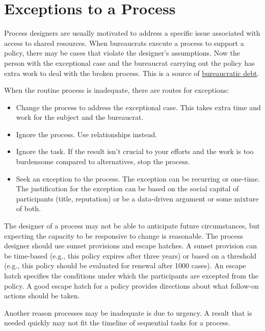 \section{Exceptions to a Process\label{sec:exceptions-to-process}}


Process designers are usually motivated to address a specific issue associated with access to shared resources. When bureaucrats execute a process to support a policy, there may be cases that violate the designer's assumptions. Now the person with the exceptional case and the bureaucrat carrying out the policy has extra work to deal with the broken process. This is a source of \hyperref[sec:bureaucratic-debt]{bureaucratic debt}. 

When the routine process is inadequate, there are routes for exceptions:
\begin{itemize}
    \item Change the process to address the exceptional case. This takes extra time and work for the subject and the bureaucrat.
    \item Ignore the process. Use relationships instead.
    \item Ignore the task. If the result isn't crucial to your efforts and the work is too burdensome compared to alternatives, stop the process.
    \item Seek an exception to the process. The exception can be recurring or one-time. The justification for the exception can be based on the social capital of participants (title, reputation) or be a data-driven argument or some mixture of both.
\end{itemize}

The designer of a process may not be able to anticipate future circumstances, but expecting the capacity to be responsive to change is reasonable. The process designer should use sunset provisions and escape hatches.  
%
%
A sunset provision can be time-based (e.g., this policy expires after three years) or based on a threshold (e.g., this policy should be evaluated for renewal after 1000 cases). An escape hatch specifies the conditions under which the participants are excepted from the policy. A good escape hatch for a policy provides directions about what follow-on actions should be taken.

Another reason processes may be inadequate is due to urgency. A result that is needed quickly may not fit the timeline of sequential tasks for a process.

